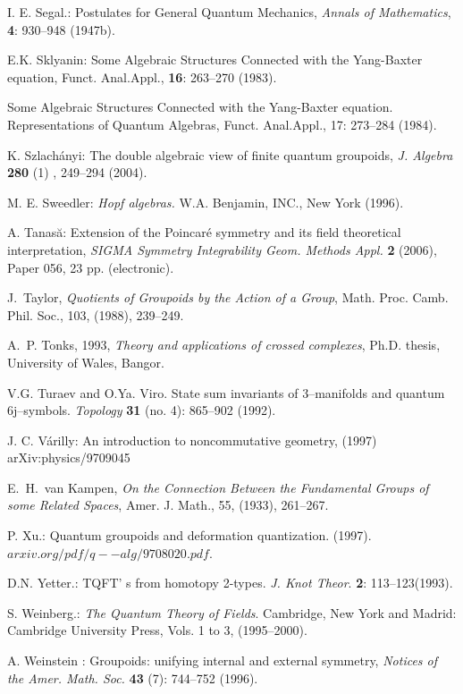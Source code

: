 \documentclass[12pt]{article}
\theoremstyle{plain}
\theoremstyle{definition}
\numberwithin{equation}{section}
\newcommand{\<}{{\langle}}
\begin{document}
\begin{thebibliography}{99}
I. E. Segal.: Postulates for General Quantum Mechanics, \emph{Annals of Mathematics}, \textbf{4}:
930--948 (1947b).

E.K. Sklyanin: Some Algebraic Structures Connected with the Yang-Baxter equation, Funct. Anal.Appl., \textbf{16}: 263--270 (1983).

Some Algebraic Structures Connected with the Yang-Baxter equation. Representations of Quantum Algebras, Funct. Anal.Appl., 17: 273--284 (1984).

K. Szlach\'anyi: The double algebraic view of finite quantum
groupoids, \emph{J. Algebra} \textbf{280} (1) , 249--294 (2004).

M. E. Sweedler: \textit{Hopf algebras.} W.A. Benjamin, INC., New
York (1996).

A. Tanas\u a: Extension of the Poincar\'e symmetry and its field
theoretical interpretation, \emph{SIGMA Symmetry Integrability
Geom. Methods Appl.} \textbf{2} (2006), Paper 056, 23 pp.
(electronic).

J.~{T}aylor, {\em Quotients of Groupoids by the Action of a
Group\/}, Math.  Proc. {C}amb. Phil. Soc., 103, (1988), 239--249.

A.~P. Tonks, 1993, {\em Theory and applications of crossed
complexes\/}, Ph.D. thesis, University of Wales, Bangor.

V.G. Turaev and O.Ya. Viro. State sum invariants of 3--manifolds and quantum
6j--symbols. \textit{Topology} \textbf{31} (no. 4): 865--902 (1992).

J. C. V\'arilly: An introduction to noncommutative geometry, (1997)
arXiv:physics/9709045

E.~H.~van {Kampen}, {\em On the Connection Between the Fundamental
Groups of some Related Spaces\/}, Amer. J. Math., 55, (1933), 261--267.

P. Xu.: Quantum groupoids and deformation quantization. (1997). $arxiv.org/pdf/q--alg/9708020.pdf$.

D.N. Yetter.: TQFT' s from homotopy 2-types. \textit{J. Knot Theor}. \textbf{2}: 113--123(1993).

S. Weinberg.:  \emph{The Quantum Theory of Fields}. Cambridge, New York and Madrid: %
Cambridge University Press, Vols. 1 to 3, (1995--2000).

A. Weinstein : Groupoids: unifying internal and external symmetry,
\emph{Notices of the Amer. Math. Soc.} \textbf{43} (7): 744--752 (1996).


\end{thebibliography}
\end{document}
